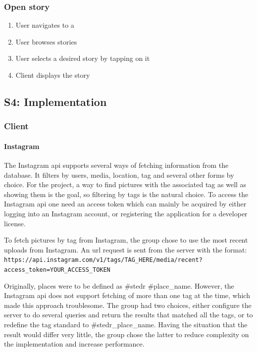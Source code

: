 \documentclass[11pt]{book}
\begin{document}
\subsubsection{Open story}
\begin{enumerate}
\item User navigates to a \wallentitys
\item User browses stories
\item User selects a desired story by tapping on it
\item Client displays the story
\end{enumerate}

\subsection{S4: Implementation}

\subsubsection{Client}
\paragraph{Instagram}
The Instagram \gls{api} supports several ways of fetching information from the database. It filters by users, media, location, tag and several other forms by choice. For the project, a way to find pictures with the associated tag as well as showing them is the goal, so filtering by tags is the natural choice. To access the Instagram \gls{api} one need an access token which can mainly be acquired by either logging into an Instagram account, or registering the application for a developer license. 

To fetch pictures by tag from Instagram, the group chose to use the most recent uploads from Instagram. An \gls{url} request is sent from the server with the format:
\texttt{https://api.instagram.com/v1/tags/TAG\_HERE/media/recent?access\_token=YOUR\_ACCESS\_TOKEN}

Originally, places were to be defined as \#stedr \#place\_name. However, the Instagram \gls{api} does not support fetching of more than one tag at the time, which made this approach troublesome. The group had two choices, either configure the server to do several queries and return the results that matched all the tags, or to redefine the tag standard to \#stedr\_place\_name. Having the situation that the result would differ very little, the group chose the latter to reduce complexity on the implementation and increase performance. 
\end{document}
